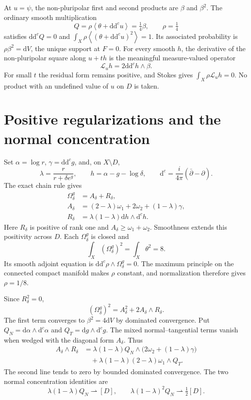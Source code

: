 \documentclass[11pt]{article}
\newcommand{\ddc}{\mathrm d\mathrm d^c}
\newcommand{\NP}[1]{\left\langle#1\right\rangle}
\begin{document}
At $u=\psi$, the non-pluripolar first and second products are $\beta$
and $\beta^2$. The ordinary smooth multiplication
\[
 Q=\rho\NP{\theta+\ddc u}=\tfrac14\beta,\qquad \rho=\tfrac14
\]
satisfies $\ddc Q=0$ and
$\int_X\rho\NP{(\theta+\ddc u)^2}=1$. Its associated probability
is $\rho\beta^2=\mathrm dV$, the unique support at $F=0$.
For every smooth $h$, the derivative of the non-pluripolar square
along $u+th$ is the meaningful measure-valued operator
\[
 \mathcal L_uh=2\ddc h\wedge\beta.
\]
For small $t$ the residual form remains positive, and Stokes gives
$\int_X\rho\mathcal L_uh=0$. No product with an undefined value
of $u$ on $D$ is taken.

\section{Positive regularizations and the normal concentration}

Set $\alpha=\log r$, $\gamma=\ddc g$, and, on $X\setminus D$,
\[
 \lambda=\frac r{r+\delta e^g},\qquad
 h=\alpha-g-\log\delta,\qquad
 \mathrm d^c=\frac{i}{4\pi}(\bar\partial-\partial).
\]
The exact chain rule gives
\begin{align*}
 \Omega_\delta^g&=A_\delta+R_\delta,\\
 A_\delta&=(2-\lambda)\omega_1+2\omega_2+(1-\lambda)\gamma,\\
 R_\delta&=\lambda(1-\lambda)\mathrm dh\wedge\mathrm d^ch.
\end{align*}
Here $R_\delta$ is positive of rank one and
$A_\delta\ge\omega_1+\omega_2$. Smoothness extends this positivity
across $D$. Each $\Omega_\delta^g$ is closed and
\[
 \int_X(\Omega_\delta^g)^2=\int_X\theta^2=8.
\]
Its smooth adjoint equation is
$\ddc\rho\wedge\Omega_\delta^g=0$. The maximum principle on the
connected compact manifold makes $\rho$ constant, and normalization
therefore gives $\rho=1/8$.

Since $R_\delta^2=0$,
\[
 (\Omega_\delta^g)^2=A_\delta^2+2A_\delta\wedge R_\delta.
\]
The first term converges to $\beta^2=4\mathrm dV$ by dominated
convergence. Put
$Q_N=\mathrm d\alpha\wedge\mathrm d^c\alpha$ and
$Q_T=\mathrm dg\wedge\mathrm d^cg$. The mixed normal--tangential
terms vanish when wedged with the diagonal form $A_\delta$. Thus
\begin{align*}
 A_\delta\wedge R_\delta
 &=\lambda(1-\lambda)Q_N\wedge
                  \bigl(2\omega_2+(1-\lambda)\gamma\bigr)\\
 &\quad+\lambda(1-\lambda)(2-\lambda)\omega_1\wedge Q_T.
\end{align*}
The second line tends to zero by bounded dominated convergence.
The two normal concentration identities are
\begin{equation}\label{eq:spikes}
 \lambda(1-\lambda)Q_N\rightharpoonup[D],\qquad
 \lambda(1-\lambda)^2Q_N\rightharpoonup\tfrac12[D].
\end{equation}
\end{document}
